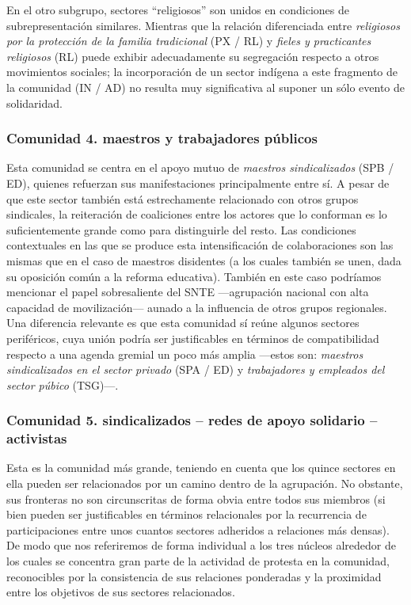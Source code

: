 \documentclass[letterpaper, 11pt]{book}
\theoremstyle{definition}
\theoremstyle{remark}
\begin{document}
En el otro subgrupo, sectores ``religiosos'' son unidos en condiciones de subrepresentación similares. 
Mientras que la relación diferenciada entre \emph{religiosos por la protección de la familia tradicional} (PX / RL) y \emph{fieles y practicantes religiosos} (RL) puede exhibir adecuadamente su segregación respecto a otros movimientos sociales; la incorporación de un sector indígena a este fragmento de la comunidad (IN / AD) no resulta muy significativa al suponer un sólo evento de solidaridad. 



\subsubsection{Comunidad 4. maestros y trabajadores públicos}
\label{subsubsec:comunidad4}

Esta comunidad se centra en el apoyo mutuo de \emph{maestros sindicalizados} (SPB / ED), quienes refuerzan sus manifestaciones principalmente entre sí. 
A pesar de que este sector también está estrechamente relacionado con otros grupos sindicales, la reiteración de coaliciones entre los actores que lo conforman es lo suficientemente grande como para distinguirle del resto. 
Las condiciones contextuales en las que se produce esta intensificación de colaboraciones son las mismas que en el caso de maestros disidentes (a los cuales también se unen, dada su oposición común a la reforma educativa). 
También en este caso podríamos mencionar el papel sobresaliente del SNTE ---agrupación nacional con alta capacidad de movilización--- aunado a la influencia de otros grupos regionales. 
Una diferencia relevante es que esta comunidad sí reúne algunos sectores periféricos, cuya unión podría ser justificables en términos de compatibilidad respecto a una agenda gremial un poco más amplia ---estos son: \emph{maestros sindicalizados en el sector privado} (SPA / ED) y \emph{trabajadores y empleados del sector púbico} (TSG)---. 



\subsubsection{Comunidad 5. sindicalizados -- redes de apoyo solidario -- activistas}
\label{subsubsec:comunidad5}

Esta es la comunidad más grande, teniendo en cuenta que los quince sectores en ella pueden ser relacionados por un camino dentro de la agrupación. 
No obstante, sus fronteras no son circunscritas de forma obvia entre todos sus miembros (si bien pueden ser justificables en términos relacionales por la recurrencia de participaciones entre unos cuantos sectores adheridos a relaciones más densas). 
De modo que nos referiremos de forma individual a los tres núcleos alrededor de los cuales se concentra gran parte de la actividad de protesta en la comunidad, reconocibles por la consistencia de sus relaciones ponderadas y la proximidad entre los objetivos de sus sectores relacionados. 
\end{document}
